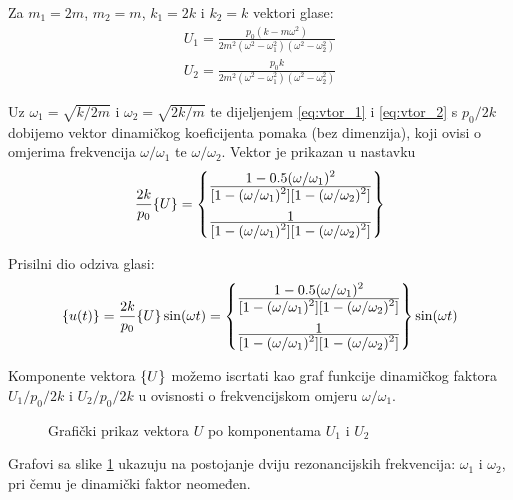 Za $m_1=2m$, $m_2=m$, $k_1=2k$ i $k_2=k$ vektori glase:
\begin{align}
    U_1=\frac{p_0(k-m\omega^2)}{2m^2(\omega^2-\omega_1^2)(\omega^2-\omega_2^2)}\label{eq:vtor_1}\\
    U_2=\frac{p_0k}{2m^2(\omega^2-\omega_1^2)(\omega^2-\omega_2^2)}\label{eq:vtor_2}
\end{align}

Uz $\omega_1=\sqrt{k/2m}$ i $\omega_2=\sqrt{2k/m}$ te dijeljenjem \eqref{eq:vtor_1} i \eqref{eq:vtor_2}
s $p_0/2k$ dobijemo vektor dinamičkog koeficijenta pomaka (bez dimenzija), koji ovisi o
omjerima frekvencija $\omega/\omega_1$ te $\omega/\omega_2$. Vektor je prikazan u nastavku
\begin{equation}
    \frac{2k}{p_0}\vtor{U}{}
    =
    \begin{Bmatrix}
        \ffrac{1-0.5(\omega/\omega_1)^2}
              {[1-(\omega/\omega_1)^2][1-(\omega/\omega_2)^2]}\\[12pt]
        \ffrac{1}
              {[1-(\omega/\omega_1)^2][1-(\omega/\omega_2)^2]}
    \end{Bmatrix}
\end{equation}

Prisilni dio odziva glasi:
\begin{equation}
    \vtor{u(t)}{} = \frac{2k}{p_0}\vtor{U}{}\sin(\omega t) = 
    \begin{Bmatrix}
        \ffrac{1-0.5(\omega/\omega_1)^2}
              {[1-(\omega/\omega_1)^2][1-(\omega/\omega_2)^2]}\\[12pt]
        \ffrac{1}
              {[1-(\omega/\omega_1)^2][1-(\omega/\omega_2)^2]}
    \end{Bmatrix}
    \sin(\omega t)
\end{equation}

Komponente vektora $\vtor{U}{}$ možemo iscrtati kao graf funkcije dinamičkog faktora
$U_1/p_0/2k$ i $U_2/p_0/2k$ u ovisnosti o frekvencijskom omjeru $\omega/\omega_1$.
\begin{figure}[H]
    \begin{subfigure}[t]{1\textwidth}
        \centering
        
    \end{subfigure}
    \vfill
    \begin{subfigure}[b]{1\textwidth}
        
    \end{subfigure}
    \caption{Grafički prikaz vektora $U$ po komponentama $U_1$ i $U_2$}
    \label{fig:vektor_dinamicki_faktor}
\end{figure}

Grafovi sa slike \ref{fig:vektor_dinamicki_faktor} ukazuju na postojanje dviju
rezonancijskih frekvencija: $\omega_1$ i $\omega_2$, pri čemu je dinamički faktor
neomeđen.
